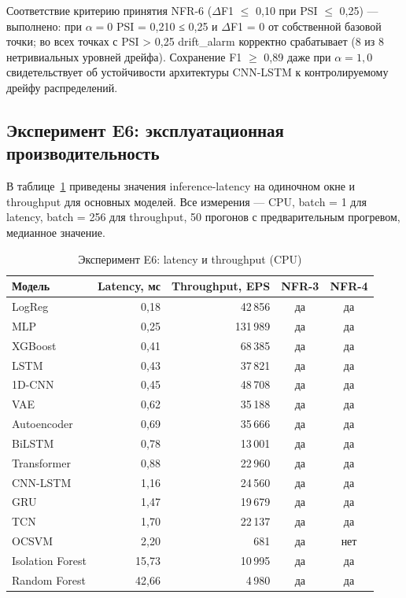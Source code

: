 Соответствие критерию принятия NFR-6 ($\Delta$F1 $\leq$ 0,10 при
PSI $\leq$ 0,25) --- выполнено: при $\alpha = 0$ PSI = 0,210 ≤
0,25 и $\Delta$F1 = 0 от собственной базовой точки; во всех
точках с PSI > 0,25 drift\_alarm корректно срабатывает (8 из 8
нетривиальных уровней дрейфа). Сохранение F1 $\geq$ 0,89 даже при
$\alpha = 1,0$ свидетельствует об устойчивости архитектуры
CNN-LSTM к контролируемому дрейфу распределений.

\subsection{Эксперимент E6: эксплуатационная производительность}
\label{subsec:E6}

В таблице~\ref{tab:E6-latency} приведены значения inference-latency
на одиночном окне и throughput для основных моделей. Все измерения
--- CPU, batch = 1 для latency, batch = 256 для throughput,
50 прогонов с предварительным прогревом, медианное значение.

\begin{table}[H]
\caption{Эксперимент E6: latency и throughput (CPU)}
\label{tab:E6-latency}
\centering
\small
\begin{tabular}{|l|r|r|c|c|}
\hline
Модель & Latency, мс & Throughput, EPS & NFR-3 & NFR-4 \\
\hline
LogReg              & 0,18  & 42\,856   & да & да \\
\hline
MLP                 & 0,25  & 131\,989  & да & да \\
\hline
XGBoost             & 0,41  & 68\,385   & да & да \\
\hline
LSTM                & 0,43  & 37\,821   & да & да \\
\hline
1D-CNN              & 0,45  & 48\,708   & да & да \\
\hline
VAE                 & 0,62  & 35\,188   & да & да \\
\hline
Autoencoder         & 0,69  & 35\,666   & да & да \\
\hline
BiLSTM              & 0,78  & 13\,001   & да & да \\
\hline
Transformer         & 0,88  & 22\,960   & да & да \\
\hline
CNN-LSTM   & 1,16 & 24\,560 & да & да \\
\hline
GRU                 & 1,47  & 19\,679   & да & да \\
\hline
TCN                 & 1,70  & 22\,137   & да & да \\
\hline
OCSVM               & 2,20  & 681       & да & нет \\
\hline
Isolation Forest    & 15,73 & 10\,995   & да & да \\
\hline
Random Forest       & 42,66 & 4\,980    & да & да \\
\hline
\end{tabular}
\end{table}

